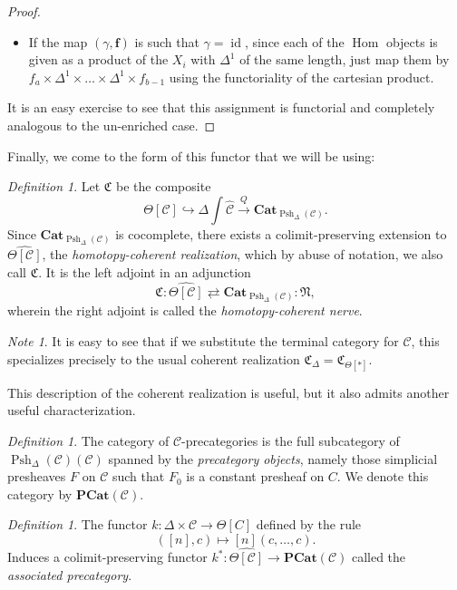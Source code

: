 \documentclass{amsart}
\numberwithin{equation}{section}
\theoremstyle{plain}   %
\theoremstyle{remark}
\newtheorem{note}[subsection]{Note}
\newtheorem{defn}[subsection]{Definition}
\theoremstyle{plain}
\DeclareMathOperator{\id}{id}
\newcommand{\Cat}{\ensuremath{\mathbf{Cat}}}
\DeclareMathOperator{\Hom}{Hom}
\newcommand{\psh}[1]{\ensuremath{\widehat{#1}}}
\newcommand{\C}{\ensuremath{\mathcal{C}}}
\newcommand{\cellset}{\ensuremath{\widehat{\Theta[\mathcal{C}]}}}
\newcommand{\spsh}{\ensuremath{\operatorname{Psh}_\Delta(\mathcal{C})}}
\begin{document}
\begin{proof}
\begin{itemize}
		\item If the map \((\gamma,\mathbf{f})\) is such that \(\gamma=\id\), since each of the \(\Hom\) objects is given as a product of the \(X_i\) with \(\Delta^1\) of the same length, just map them by \(f_a\times\Delta^1\times \dots \times\Delta^1 \times f_{b-1}\) using the functoriality of the cartesian product.
	\end{itemize}
	It is an easy exercise to see that this assignment is functorial and completely analogous to the un-enriched case.
\end{proof}

Finally, we come to the form of this functor that we will be using:

\begin{defn} Let \(\mathfrak{C}\) be the composite \[\Theta[\C]\hookrightarrow\Delta\int \psh{\C} \xrightarrow{Q} \Cat_{\spsh}.\] Since \(\Cat_{\spsh}\) is cocomplete, there exists a colimit-preserving extension to \(\cellset\), the \emph{homotopy-coherent realization}, which by abuse of notation, we also call \(\mathfrak{C}\).  It is the left adjoint in an adjunction \[\mathfrak{C}:\cellset\rightleftarrows \Cat_{\spsh}:\mathfrak{N},\]  wherein the right adjoint is called the \emph{homotopy-coherent nerve}.
\end{defn}

\begin{note}
	It is easy to see that if we substitute the terminal category for \(\C\), this specializes precisely to the usual coherent realization \(\mathfrak{C}_{\Delta} = \mathfrak{C}_{\Theta[\ast]}\).  
\end{note}

This description of the coherent realization is useful, but it also admits another useful characterization.

\begin{defn} 
	The category of \(\C\)-precategories is the full subcategory of \(\spsh(\C)\) spanned by the \emph{precategory objects}, namely those simplicial presheaves \(F\) on \(\C\) such that \(F_0\) is a constant presheaf on \(C\).  We denote this category by \(\mathbf{PCat}(\C)\). 
\end{defn}

\begin{defn}
	The functor \(k: \Delta \times \C\to \Theta[C]\) defined by the rule 
	\[
		([n],c) \mapsto [n](c,\dots,c).
	\]
	Induces a colimit-preserving functor \(k^\ast: \cellset \to \mathbf{PCat}(\C)\) called the \emph{associated precategory}.
\end{defn}
\end{document}
